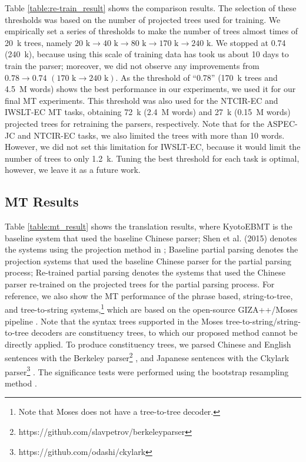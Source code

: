 \documentclass[english]{jnlp_1.4}
\begin{document}
\begin{table}[b]
\label{table:re-train_result}

\end{table}

{Table \ref{table:re-train_result} shows the comparison results. The selection 
of these thresholds was based on the number of projected trees used for training.
We empirically set a series of thresholds to make the number of trees almost times of 20~k 
trees, namely $\text{20~k}\rightarrow\text{40~k}\rightarrow\text{80~k}\rightarrow\text{170~k}\rightarrow\text{240~k}$.
We stopped at 0.74 (240~k), because using this scale of training data has took us about 10 
days to train the parser; moreover, we did not observe any improvements from 
$0.78\rightarrow0.74$ $(\text{170~k}\rightarrow\text{240~k})$. As the threshold of ``0.78'' (170~k trees and 4.5~M words) shows the best 
performance in our experiments, we used it for our final MT experiments. This threshold
was also used for the NTCIR-EC and IWSLT-EC MT tasks, obtaining 72~k (2.4~M words) and 27~k (0.15~M words) projected trees 
for retraining the parsers, respectively. Note that for the ASPEC-JC and NTCIR-EC tasks,
we also limited the trees with more than 10 words. However, we did not set this limitation
for IWSLT-EC, because it would limit the number of trees to only 1.2~k.
Tuning the best threshold for each task is optimal, however, we leave it as a future work.}


\subsection{MT Results}

Table \ref{table:mt_result} shows the translation results, where KyotoEBMT is the baseline system that
used the baseline Chinese parser; {Shen et al. (2015) denotes the systems using the projection method
in \cite{Shen2015a}}; Baseline partial parsing denotes the projection 
systems that used the baseline Chinese parser for the partial parsing process;
Re-trained partial parsing denotes the systems that used the Chinese parser re-trained 
on the projected trees for the partial parsing process. For reference, we also show 
the MT performance of the phrase based, string-to-tree, and tree-to-string 
systems,\footnote{{Note that Moses does not have a tree-to-tree decoder.}} which 
are based on the open-source GIZA++/Moses pipeline \cite{koehn-EtAl:2007:PosterDemo}. 
{Note that the syntax trees supported in the Moses tree-to-string/string-to-tree decoders 
are constituency trees, to which our proposed method cannot be directly applied. To produce constituency trees, 
we parsed Chinese and English sentences 
with the Berkeley parser\footnote{https://github.com/slavpetrov/berkeleyparser}
\cite{petrov-klein:2007:main}, and Japanese sentences with the Ckylark 
parser\footnote{{https://github.com/odashi/ckylark}} \cite{oda-EtAl:2015:demos}.}
The significance tests were 
performed using the bootstrap resampling method \cite{koehn:2004:EMNLP}.
\end{document}
